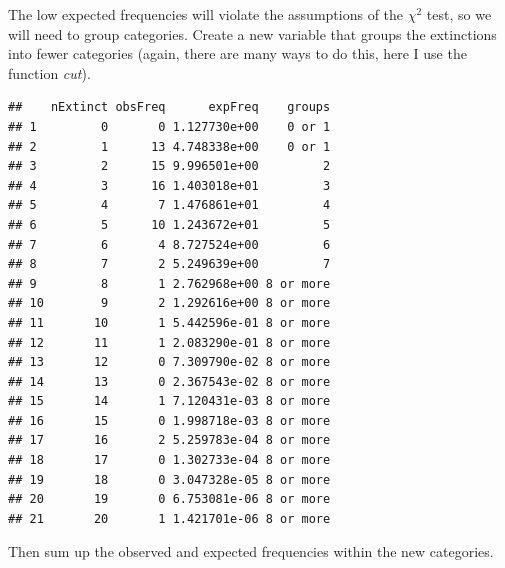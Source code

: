 \documentclass[]{article}
\newenvironment{Shaded}{\begin{snugshade}}{\end{snugshade}}
\newcommand{\DataTypeTok}[1]{\textcolor[rgb]{0.13,0.29,0.53}{#1}}
\newcommand{\DecValTok}[1]{\textcolor[rgb]{0.00,0.00,0.81}{#1}}
\newcommand{\KeywordTok}[1]{\textcolor[rgb]{0.13,0.29,0.53}{\textbf{#1}}}
\newcommand{\NormalTok}[1]{#1}
\newcommand{\OperatorTok}[1]{\textcolor[rgb]{0.81,0.36,0.00}{\textbf{#1}}}
\newcommand{\OtherTok}[1]{\textcolor[rgb]{0.56,0.35,0.01}{#1}}
\newcommand{\StringTok}[1]{\textcolor[rgb]{0.31,0.60,0.02}{#1}}
\begin{document}
The low expected frequencies will violate the assumptions of the
\(\chi^2\) test, so we will need to group categories. Create a new
variable that groups the extinctions into fewer categories (again, there
are many ways to do this, here I use the function \emph{cut}).

\begin{Shaded}
\end{Shaded}

\begin{verbatim}
##    nExtinct obsFreq      expFreq    groups
## 1         0       0 1.127730e+00    0 or 1
## 2         1      13 4.748338e+00    0 or 1
## 3         2      15 9.996501e+00         2
## 4         3      16 1.403018e+01         3
## 5         4       7 1.476861e+01         4
## 6         5      10 1.243672e+01         5
## 7         6       4 8.727524e+00         6
## 8         7       2 5.249639e+00         7
## 9         8       1 2.762968e+00 8 or more
## 10        9       2 1.292616e+00 8 or more
## 11       10       1 5.442596e-01 8 or more
## 12       11       1 2.083290e-01 8 or more
## 13       12       0 7.309790e-02 8 or more
## 14       13       0 2.367543e-02 8 or more
## 15       14       1 7.120431e-03 8 or more
## 16       15       0 1.998718e-03 8 or more
## 17       16       2 5.259783e-04 8 or more
## 18       17       0 1.302733e-04 8 or more
## 19       18       0 3.047328e-05 8 or more
## 20       19       0 6.753081e-06 8 or more
## 21       20       1 1.421701e-06 8 or more
\end{verbatim}

Then sum up the observed and expected frequencies within the new
categories.
\end{document}
